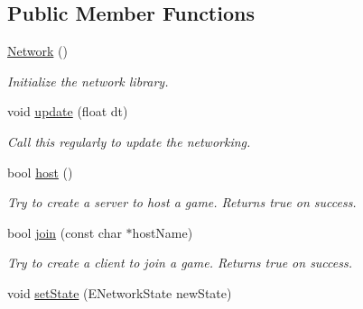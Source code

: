 \subsection*{\-Public \-Member \-Functions}
\begin{DoxyCompactItemize}
\item 
\hypertarget{classNetwork_a3cc2fb4f8fa4d507077e8da85ce5a1c8}{
\hyperlink{classNetwork_a3cc2fb4f8fa4d507077e8da85ce5a1c8}{\-Network} ()}
\label{d5/d16/classNetwork_a3cc2fb4f8fa4d507077e8da85ce5a1c8}

\begin{DoxyCompactList}\small\item\em \-Initialize the network library. \end{DoxyCompactList}\item 
\hypertarget{classNetwork_ab26b36fc6072ff01a1d97e163522ab22}{
void \hyperlink{classNetwork_ab26b36fc6072ff01a1d97e163522ab22}{update} (float dt)}
\label{d5/d16/classNetwork_ab26b36fc6072ff01a1d97e163522ab22}

\begin{DoxyCompactList}\small\item\em \-Call this regularly to update the networking. \end{DoxyCompactList}\item 
\hypertarget{classNetwork_a65a873da1bcc9b2af1f4c6bdf965e2fd}{
bool \hyperlink{classNetwork_a65a873da1bcc9b2af1f4c6bdf965e2fd}{host} ()}
\label{d5/d16/classNetwork_a65a873da1bcc9b2af1f4c6bdf965e2fd}

\begin{DoxyCompactList}\small\item\em \-Try to create a server to host a game. \-Returns true on success. \end{DoxyCompactList}\item 
\hypertarget{classNetwork_a3cd71654e09805dc0dac6d01ca59da52}{
bool \hyperlink{classNetwork_a3cd71654e09805dc0dac6d01ca59da52}{join} (const char $\ast$host\-Name)}
\label{d5/d16/classNetwork_a3cd71654e09805dc0dac6d01ca59da52}

\begin{DoxyCompactList}\small\item\em \-Try to create a client to join a game. \-Returns true on success. \end{DoxyCompactList}\item 
\hypertarget{classNetwork_ad45ce733e0433ec516e516fb0bfd93a0}{
void \hyperlink{classNetwork_ad45ce733e0433ec516e516fb0bfd93a0}{set\-State} (\-E\-Network\-State new\-State)}
\label{d5/d16/classNetwork_ad45ce733e0433ec516e516fb0bfd93a0}


\end{DoxyCompactItemize}
